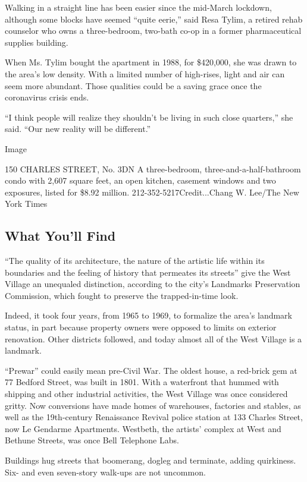 Walking in a straight line has been easier since the mid-March lockdown,
although some blocks have seemed ``quite eerie,'' said Resa Tylim, a
retired rehab counselor who owns a three-bedroom, two-bath co-op in a
former pharmaceutical supplies building.

When Ms. Tylim bought the apartment in 1988, for \$420,000, she was
drawn to the area's low density. With a limited number of high-rises,
light and air can seem more abundant. Those qualities could be a saving
grace once the coronavirus crisis ends.

``I think people will realize they shouldn't be living in such close
quarters,'' she said. ``Our new reality will be different.''

Image

150 CHARLES STREET, No. 3DN \textbar{} A three-bedroom,
three-and-a-half-bathroom condo with 2,607 square feet, an open kitchen,
casement windows and two exposures, listed for \$8.92 million.
212-352-5217Credit...Chang W. Lee/The New York Times

\hypertarget{what-youll-find}{%
\subsection{What You'll Find}\label{what-youll-find}}

``The quality of its architecture, the nature of the artistic life
within its boundaries and the feeling of history that permeates its
streets'' give the West Village an unequaled distinction, according to
the city's Landmarks Preservation Commission, which fought to preserve
the trapped-in-time look.

Indeed, it took four years, from 1965 to 1969, to formalize the area's
landmark status, in part because property owners were opposed to limits
on exterior renovation. Other districts followed, and today almost all
of the West Village is a landmark.

``Prewar'' could easily mean pre-Civil War. The oldest house, a
red-brick gem at 77 Bedford Street, was built in 1801. With a waterfront
that hummed with shipping and other industrial activities, the West
Village was once considered gritty. Now conversions have made homes of
warehouses, factories and stables, as well as the 19th-century
Renaissance Revival police station at 133 Charles Street, now Le
Gendarme Apartments. Westbeth, the artists' complex at West and Bethune
Streets, was once Bell Telephone Labs.

Buildings hug streets that boomerang, dogleg and terminate, adding
quirkiness. Six- and even seven-story walk-ups are not uncommon.

